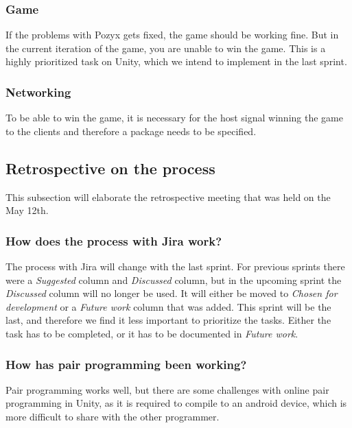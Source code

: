 \subsubsection{Game}
If the problems with Pozyx gets fixed, the game should be working fine.
But in the current iteration of the game, you are unable to win the game.
This is a highly prioritized task on Unity, which we intend to implement in the last sprint.

\subsubsection{Networking}
To be able to win the game, it is necessary for the host signal winning the game to the clients and therefore a package needs to be specified.

\subsection{Retrospective on the process}
This subsection will elaborate the retrospective meeting that was held on the May 12th.

\subsubsection*{How does the process with Jira work?}
The process with Jira will change with the last sprint.
For previous sprints there were a \textit{Suggested} column and \textit{Discussed} column, but in the upcoming sprint the \textit{Discussed} column will no longer be used.
It will either be moved to \textit{Chosen for development} or a \textit{Future work} column that was added.
This sprint will be the last, and therefore we find it less important to prioritize the tasks.
Either the task has to be completed, or it has to be documented in \textit{Future work}.

\subsubsection*{How has pair programming been working?}
Pair programming works well, but there are some challenges with online pair programming in Unity, as it is required to compile to an android device, which is more difficult to share with the other programmer.

